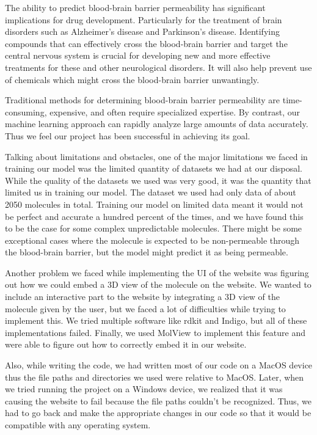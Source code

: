 \documentclass[fontsize=11pt]{article}
\begin{document}
The ability to predict blood-brain barrier permeability has significant implications for drug development. Particularly for the treatment of brain disorders such as Alzheimer's disease and Parkinson's disease. Identifying compounds that can effectively cross the blood-brain barrier and target the central nervous system is crucial for developing new and more effective treatments for these and other neurological disorders. It will also help prevent use of chemicals which might cross the blood-brain barrier unwantingly.

Traditional methods for determining blood-brain barrier permeability are time-consuming, expensive, and often require specialized expertise. By contrast, our machine learning approach can rapidly analyze large amounts of data accurately. Thus we feel our project has been successful in achieving its goal.

Talking about limitations and obstacles, one of the major limitations we faced in training our model was the limited quantity of datasets we had at our disposal. While the quality of the datasets we used was very good, it was the quantity that limited us in training our model. The dataset we used had only data of about 2050 molecules in total. Training our model on limited data meant it would not be perfect and accurate a hundred percent of the times, and we have found this to be the case for some complex unpredictable molecules. There might be some exceptional cases where the molecule is expected to be non-permeable through the blood-brain barrier, but the model might predict it as being permeable. 

Another problem we faced while implementing the UI of the website was figuring out how we could embed a 3D view of the molecule on the website. We wanted to include an interactive part to the website by integrating a 3D view of the molecule given by the user, but we faced a lot of difficulties while trying to implement this. We tried multiple software like rdkit and Indigo, but all of these implementations failed. Finally, we used MolView to implement this feature and were able to figure out how to correctly embed it in our website.

Also, while writing the code, we had written most of our code on a MacOS device thus the file paths and directories we used were relative to MacOS. Later, when we tried running the project on a Windows device, we realized that it was causing the website to fail because the file paths couldn’t be recognized. Thus, we had to go back and make the appropriate changes in our code so that it would be compatible with any operating system.
\end{document}

